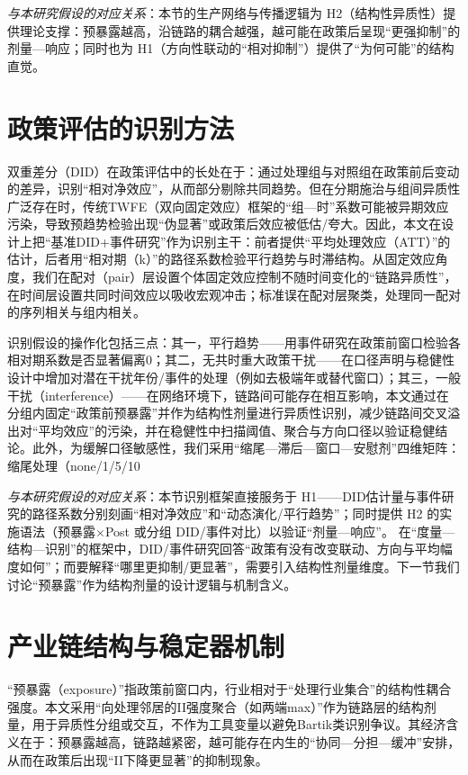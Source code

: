 \noindent\textit{与本研究假设的对应关系}：本节的生产网络与传播逻辑为 H2（结构性异质性）提供理论支撑：预暴露越高，沿链路的耦合越强，越可能在政策后呈现“更强抑制”的剂量—响应；同时也为 H1（方向性联动的“相对抑制”）提供了“为何可能”的结构直觉。
\section{政策评估的识别方法}
双重差分（DID）在政策评估中的长处在于：通过处理组与对照组在政策前后变动的差异，识别“相对净效应”，从而部分剔除共同趋势。但在分期施治与组间异质性广泛存在时，传统TWFE（双向固定效应）框架的“组—时”系数可能被异期效应污染，导致预趋势检验出现“伪显著”或政策后效应被低估/夸大\citep{sun2021event}。因此，本文在设计上把“基准DID+事件研究”作为识别主干：前者提供“平均处理效应（ATT）”的估计，后者用“相对期（k）”的路径系数检验平行趋势与时滞结构。从固定效应角度，我们在配对（pair）层设置个体固定效应控制不随时间变化的“链路异质性”，在时间层设置共同时间效应以吸收宏观冲击；标准误在配对层聚类，处理同一配对的序列相关与组内相关\citep{bertrand2004much,cameron2015practitioner}。

识别假设的操作化包括三点：其一，平行趋势——用事件研究在政策前窗口检验各相对期系数是否显著偏离0；其二，无共时重大政策干扰——在口径声明与稳健性设计中增加对潜在干扰年份/事件的处理（例如去极端年或替代窗口）；其三，一般干扰（interference）——在网络环境下，链路间可能存在相互影响，本文通过在分组内固定“政策前预暴露”并作为结构性剂量进行异质性识别，减少链路间交叉溢出对“平均效应”的污染，并在稳健性中扫描阈值、聚合与方向口径以验证稳健结论\citep{aronow2017interference,athey2018network}。此外，为缓解口径敏感性，我们采用“缩尾—滞后—窗口—安慰剂”四维矩阵：缩尾处理（none/1/5/10%

\noindent\textit{与本研究假设的对应关系}：本节识别框架直接服务于 H1——DID估计量与事件研究的路径系数分别刻画“相对净效应”和“动态演化/平行趋势”；同时提供 H2 的实施语法（预暴露×Post 或分组 DID/事件对比）以验证“剂量—响应”。
在“度量—结构—识别”的框架中，DID/事件研究回答“政策有没有改变联动、方向与平均幅度如何”；而要解释“哪里更抑制/更显著”，需要引入结构性剂量维度。下一节我们讨论“预暴露”作为结构剂量的设计逻辑与机制含义。

\section{产业链结构与稳定器机制}
“预暴露（exposure）”指政策前窗口内，行业相对于“处理行业集合”的结构性耦合强度。本文采用“向处理邻居的II强度聚合（如两端max）”作为链路层的结构剂量，用于异质性分组或交互，不作为工具变量以避免Bartik类识别争议\citep{goldsmithpinkham2020bartik}。其经济含义在于：预暴露越高，链路越紧密，越可能存在内生的“协同—分担—缓冲”安排，从而在政策后出现“II下降更显著”的抑制现象。

